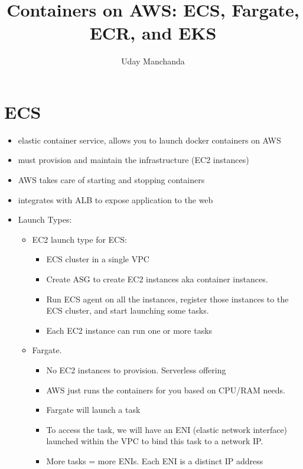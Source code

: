 \documentclass[]{scrartcl}
\title{Containers on AWS: ECS, Fargate, ECR, and EKS}
\author{Uday Manchanda}
\begin{document}
\maketitle

\section{ECS}
\begin{itemize}
	\item elastic container service, allows you to launch docker containers on AWS
	\item must provision and maintain the infrastructure (EC2 instances)
	\item AWS takes care of starting and stopping containers
	\item integrates with ALB to expose application to the web
	\item Launch Types:
	\begin{itemize}
		\item EC2 launch type for ECS: 
		\begin{itemize}
			\item ECS cluster in a single VPC
			\item Create ASG to create EC2 instances aka container instances. 
			\item Run ECS agent on all the instances, register those instances to the ECS cluster, and start launching some tasks. 
			\item Each EC2 instance can run one or more tasks
		\end{itemize}
		\item Fargate. 
		\begin{itemize}
			\item No EC2 instances to provision. Serverless offering
			\item AWS just runs the containers for you based on CPU/RAM needs. 
			\item Fargate will launch a task
			\item To access the task, we will have an ENI (elastic network interface) launched within the VPC to bind this task to a network IP. 
			\item More tasks = more ENIs. Each ENI is a distinct IP address
		\end{itemize}
	\end{itemize}
\end{itemize}
\end{document}
